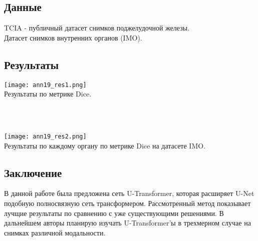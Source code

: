 \subsection*{Данные}
TCIA - публичный датасет снимков поджелудочной железы.\\
Датасет снимков внутренних органов (IMO).
\subsection*{Результаты}

\begin{minipage}{1.0\linewidth}
    \begin{center}
        \texttt{[image: ann19\_res1.png]} \\
        \caption{\scriptsize{
            Результаты по метрике Dice.
        }}
    \end{center}
    
\end{minipage}
\\
\\
\begin{minipage}{1.0\linewidth}
    \begin{center}
        \texttt{[image: ann19\_res2.png]} \\
        \caption{\scriptsize{ 
             Результаты по каждому органу по метрике Dice на датасете IMO.}}
    \end{center}
    
\end{minipage} 

\subsection*{Заключение}
В данной работе была предложена сеть U-Transformer, которая расширяет U-Net подобную 
полносвязную сеть трансформером. Рассмотренный метод показывает лучщие результаты 
по сравнению с уже существующими решениями. В дальнейшем авторы планирую изучать 
U-Transformer'ы в трехмерном случае на снимках различной модальности.